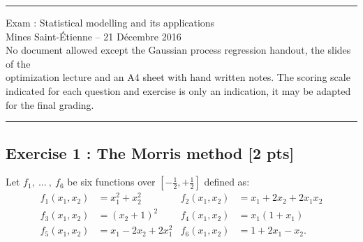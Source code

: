 \documentclass[a4paper,10pt]{article}
\begin{document}
\begin{center}
\hrule \vspace{3mm}
	{\Large Exam : Statistical modelling and its applications}\\ \vspace{3mm}
	{Mines Saint-\'Etienne -- 21 Décembre 2016} \\  \vspace{2mm}
	{\footnotesize No document allowed except the Gaussian process regression handout, the slides of the \\ optimization lecture and an A4 sheet with hand written notes. The scoring scale indicated for each question and exercise is only an indication, it may be adapted for the final grading. }\\ \vspace{3mm}
	\hrule
\end{center}
\vspace{5mm}

\subsection*{Exercise 1 : The Morris method \hfill [2 pts]} 

Let $f_1,\ \dots \ ,\ f_6$ be six functions over $[-\frac{1}{2}, + \frac{1}{2}]$ defined as:
\begin{align*}
f_1 \left(x_1, x_2 \right) &= x_1^2 + x_2^2 & f_2 \left(x_1, x_2 \right) &= x_1 + 2 x_2 + 2x_1 x_2  \\  
f_3\left(x_1, x_2 \right)&= \left(x_2 + 1\right)^2 & f_4 \left(x_1, x_2\right)&= x_1\left(1+x_1\right) \\  
f_5 \left(x_1, x_2 \right) &= x_1 - 2 x_2 + 2x_1^2 & f_6 \left(x_1, x_2 \right) &= 1+ 2 x_1 - x_2.
\end{align*}
\end{document}

